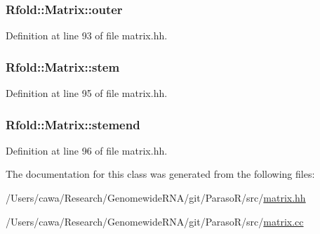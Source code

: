 \hypertarget{class_rfold_1_1_matrix_ae939207a96342deb8ed1268b9dbdc6d1}{
\subsubsection[{outer}]{ Rfold\+::\+Matrix\+::outer}}\label{class_rfold_1_1_matrix_ae939207a96342deb8ed1268b9dbdc6d1}


Definition at line 93 of file matrix.\+hh.

\hypertarget{class_rfold_1_1_matrix_a20247950e209e5d6d72ef7471c31ec7e}{
\subsubsection[{stem}]{ Rfold\+::\+Matrix\+::stem}}\label{class_rfold_1_1_matrix_a20247950e209e5d6d72ef7471c31ec7e}


Definition at line 95 of file matrix.\+hh.

\hypertarget{class_rfold_1_1_matrix_a64d321f4b4a5447961cd0acc356b2758}{
\subsubsection[{stemend}]{ Rfold\+::\+Matrix\+::stemend}}\label{class_rfold_1_1_matrix_a64d321f4b4a5447961cd0acc356b2758}


Definition at line 96 of file matrix.\+hh.



The documentation for this class was generated from the following files\+:\begin{DoxyCompactItemize}
\item 
/\+Users/cawa/\+Research/\+Genomewide\+R\+N\+A/git/\+Paraso\+R/src/\hyperlink{matrix_8hh}{matrix.\+hh}\item 
/\+Users/cawa/\+Research/\+Genomewide\+R\+N\+A/git/\+Paraso\+R/src/\hyperlink{matrix_8cc}{matrix.\+cc}\end{DoxyCompactItemize}
